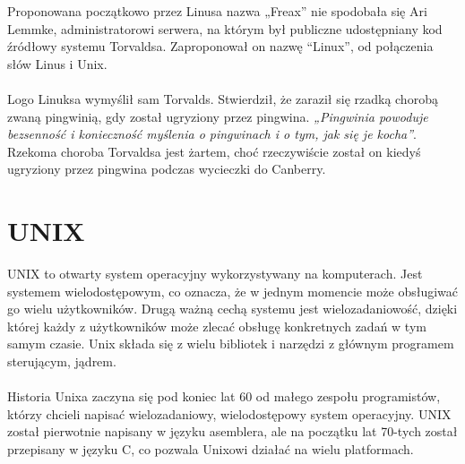 \documentclass[10pt,a4paper]{report}
\begin{document}
\begin{adjustwidth}{2cm}{2cm}
\begin{minipage}{1\linewidth}
\vspace{0.3cm}
Proponowana początkowo przez Linusa nazwa „Freax” nie spodobała się  Ari Lemmke, administratorowi serwera, na którym był publiczne udostępniany kod źródłowy systemu Torvaldsa. Zaproponował on nazwę “Linux”, od połączenia słów  Linus i Unix.  \\ \\
Logo Linuksa wymyślił sam Torvalds. Stwierdził, że zaraził się rzadką chorobą zwaną pingwinią, gdy został ugryziony przez pingwina. \textit{„Pingwinia powoduje bezsenność i konieczność myślenia o pingwinach i o tym, jak się je kocha”}. Rzekoma choroba Torvaldsa jest żartem, choć rzeczywiście został on kiedyś ugryziony przez pingwina podczas wycieczki do Canberry. 
\end{minipage}
\section{UNIX}
\begin{minipage}{1\linewidth}
UNIX to otwarty system operacyjny wykorzystywany na komputerach. Jest systemem wielodostępowym, co oznacza, że w jednym momencie może obsługiwać go wielu użytkowników. Drugą ważną cechą systemu jest wielozadaniowość, dzięki której każdy z użytkowników może zlecać obsługę konkretnych zadań w tym samym czasie. Unix składa się z wielu bibliotek i narzędzi z głównym programem sterującym, jądrem. \\ \\
Historia Unixa zaczyna się pod koniec lat 60 od małego zespołu programistów, którzy chcieli napisać wielozadaniowy, wielodostępowy system operacyjny.
UNIX został pierwotnie napisany w języku asemblera, ale na początku lat 70-tych został przepisany w języku  C, co pozwala Unixowi działać na wielu platformach. 
\end{minipage}

\end{adjustwidth}
\end{document}
